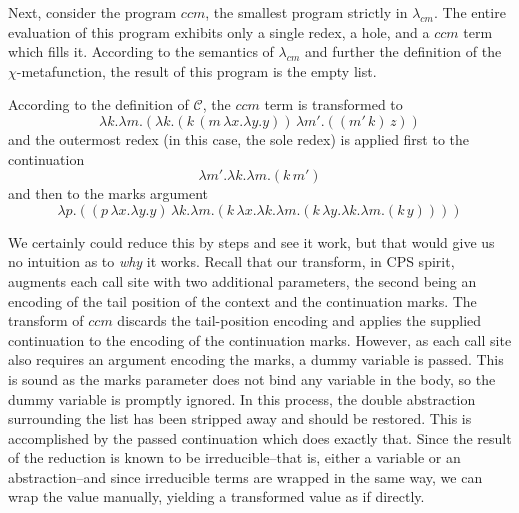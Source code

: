\documentclass[ms,electronic,twosidetoc,letterpaper,chaptercenter,parttop]{byumsphd}
\begin{document}
Next, consider the program $ccm$, the smallest program strictly in $\lambda_{cm}$. 
The entire evaluation of this program exhibits only a single redex, a hole, and a $ccm$ 
term which fills it. According to the semantics of $\lambda_{cm}$ and further the definition of the 
$\chi$-metafunction, the result of this program is the empty list.

According to the definition of $\mathcal{C}$, the $ccm$ term is transformed to
\[
\lambda k.\lambda m.(\lambda k.(k\,(m\,\lambda x.\lambda y.y))\,\lambda m'.((m'\,k)\,z))
\]
and the outermost redex (in this case, the sole redex) is applied first to the continuation
\[
\lambda m'.\lambda k.\lambda m.(k\,m')
\]
and then to the marks argument
\[
\lambda p.((p\,\lambda x.\lambda y.y)\,\lambda k.\lambda m.(k\,\lambda x.\lambda k.\lambda m.(k\,\lambda y.\lambda k.\lambda m.(k\,y))))
\]

We certainly could reduce this by steps and see it work, but that would give us no intuition as to \emph{why} it works. Recall that our transform, in CPS spirit, augments each call site with two additional parameters, the second being an encoding of the tail position of the context and the continuation marks. The transform of $ccm$ discards the tail-position encoding and applies the supplied continuation to the encoding of the continuation marks. However, as each call site also requires an argument encoding the marks, a dummy variable is passed. This is sound as the marks parameter does not bind any variable in the body, so the dummy variable is promptly ignored. In this process, the double abstraction surrounding the list has been stripped away and should be restored. This is accomplished by the passed continuation which does exactly that. Since the result of the reduction is known to be irreducible--that is, either a variable or an abstraction--and since irreducible terms are wrapped in the same way, we can wrap the value manually, yielding a transformed value as if directly.





 
\end{document}
